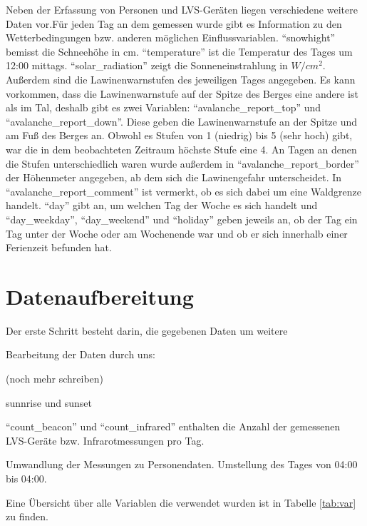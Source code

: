 \documentclass[12pt]{scrreprt}
\begin{document}
	Neben der Erfassung von Personen und LVS-Geräten liegen verschiedene weitere Daten vor.Für jeden Tag an dem gemessen wurde gibt es Information zu den Wetterbedingungen bzw. anderen möglichen Einflussvariablen. "`snowhight"' bemisst die Schneehöhe in cm. "`temperature"' ist die Temperatur des Tages um 12:00 mittags. "`solar\_radiation"' zeigt die Sonneneinstrahlung in $W/cm^2$. Außerdem sind die Lawinenwarnstufen des jeweiligen Tages angegeben. Es kann vorkommen, dass die Lawinenwarnstufe auf der Spitze des Berges eine andere ist als im Tal, deshalb gibt es zwei Variablen: "`avalanche\_report\_top"' und "`avalanche\_report\_down"'. Diese geben die Lawinenwarnstufe an der Spitze und am Fuß des Berges an. Obwohl es Stufen von 1 (niedrig) bis 5 (sehr hoch) gibt, war die in dem beobachteten Zeitraum höchste Stufe eine 4. An Tagen an denen die Stufen unterschiedlich waren wurde außerdem in "`avalanche\_report\_border"' der Höhenmeter angegeben, ab dem sich die Lawinengefahr unterscheidet. In "`avalanche\_report\_comment"' ist vermerkt, ob es sich dabei um eine Waldgrenze handelt. "`day"' gibt an, um welchen Tag der Woche es sich handelt und "`day\_weekday"', "`day\_weekend"' und "`holiday"' geben jeweils an, ob der Tag ein Tag unter der Woche oder am Wochenende war und ob er sich innerhalb einer Ferienzeit befunden hat.
	
	
	
	\section{Datenaufbereitung}
	
	Der erste Schritt besteht darin, die gegebenen Daten um weitere 
	
	Bearbeitung der Daten durch uns:
	
	(noch mehr schreiben)
	
	sunnrise und sunset
	
	"`count\_beacon"' und "`count\_infrared"' enthalten die Anzahl der gemessenen LVS-Geräte bzw. Infrarotmessungen pro Tag.
	
	Umwandlung der Messungen zu Personendaten. Umstellung des Tages von 04:00 bis 04:00.
	
	Eine Übersicht über alle Variablen die verwendet wurden ist in Tabelle \ref{tab:var} zu finden.
	
	
	
	
	
\end{document}
